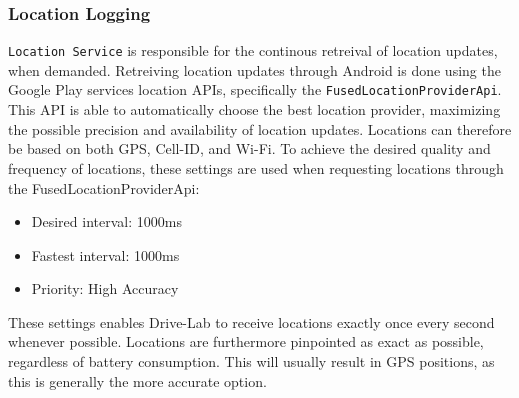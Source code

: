 \subsubsection{Location Logging}\label{subsubsec:location_logging}
\texttt{Location Service} is responsible for the continous retreival of location updates, when demanded. Retreiving location updates through Android is done using the Google Play services location APIs, specifically the \texttt{FusedLocationProviderApi}\citep{android_fusedlocationproviderapi}. This API is able to automatically choose the best location provider, maximizing the possible precision and availability of location updates. Locations can therefore be based on both GPS, Cell-ID, and Wi-Fi. To achieve the desired quality and frequency of locations, these settings are used when requesting locations through the FusedLocationProviderApi:

\begin{itemize}
\item Desired interval: 1000ms
\item Fastest interval: 1000ms
\item Priority: High Accuracy
\end{itemize}

These settings enables Drive-Lab to receive locations exactly once every second whenever possible. Locations are furthermore pinpointed as exact as possible, regardless of battery consumption. This will usually result in GPS positions, as this is generally the more accurate option.